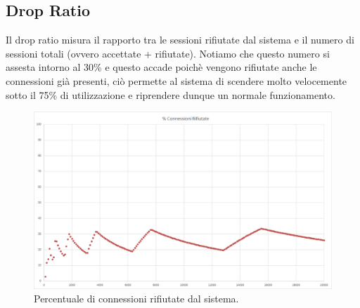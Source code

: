 \subsection{Drop Ratio}
Il drop ratio misura il rapporto tra le sessioni rifiutate dal sistema e il numero di sessioni totali (ovvero accettate + rifiutate).
Notiamo che questo numero si assesta intorno al 30\% e questo accade poichè vengono rifiutate anche le connessioni già presenti, ciò permette al sistema di scendere molto velocemente sotto il 75\% di utilizzazione e riprendere dunque un normale funzionamento.
\begin{figure}[H]
	\begin{center}
	\includegraphics[scale=0.4]{img/Drop_ratio.png}
	\caption[Percentuale di connessioni rifiutate dal sistema.]{Percentuale di connessioni rifiutate dal sistema.}
	\label{fig:confr_distrib}
	\end{center}
\end{figure}

